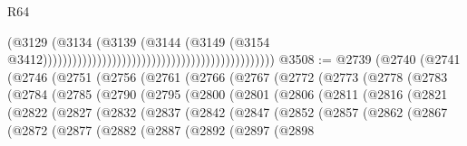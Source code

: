 \begin{lexlean}{R64}
\begin{coremodule}
                                                                                      (@3129
                                                                                        (@3134
                                                                                          (@3139
                                                                                            (@3144
                                                                                              (@3149
                                                                                                (@3154
                                                                                                  @3412)))))))))))))))))))))))))))))))))))))))))))))))
@3508 := @2739
    (@2740
      (@2741
        (@2746
          (@2751
            (@2756
              (@2761
                (@2766
                  (@2767
                    (@2772
                      (@2773
                        (@2778
                          (@2783
                            (@2784
                              (@2785
                                (@2790
                                  (@2795
                                    (@2800
                                      (@2801
                                        (@2806
                                          (@2811
                                            (@2816
                                              (@2821
                                                (@2822
                                                  (@2827
                                                    (@2832
                                                      (@2837
                                                        (@2842
                                                          (@2847
                                                            (@2852
                                                              (@2857
                                                                (@2862
                                                                  (@2867
                                                                    (@2872
                                                                      (@2877
                                                                        (@2882
                                                                          (@2887
                                                                            (@2892
                                                                              (@2897
                                                                                (@2898

\end{coremodule}
\end{lexlean}
